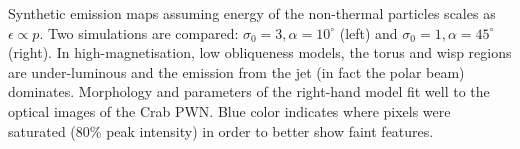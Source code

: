 Synthetic emission maps assuming energy of the non-thermal particles scales as  $\epsilon\propto p$.  Two simulations are compared: $\sigma_0=3,\alpha=10^\circ$ (left) and $\sigma_0=1,\alpha=45^\circ$ (right).  In high-magnetisation, low obliqueness models, the torus and wisp regions are under-luminous and the emission from the jet (in fact the polar beam) dominates.  Morphology and parameters of the right-hand model fit well to the optical images of the Crab PWN.  Blue color indicates where pixels were saturated ($80\%$ peak intensity) in order to better show faint features.